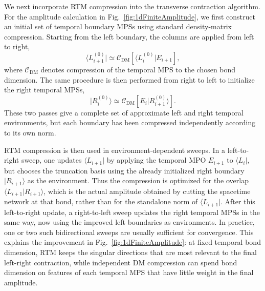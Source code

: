 \documentclass[12pt]{article}
\begin{document}
We next incorporate RTM compression into the transverse contraction algorithm.
For the amplitude calculation in Fig.~\ref{fig:1dFiniteAmplitude}, we first construct an initial set of temporal boundary MPSs using standard density-matrix compression.
Starting from the left boundary, the columns are applied from left to right,
\begin{equation}
\langle L_{i+1}^{(0)}|\simeq \mathcal C_{\mathrm{DM}}\!\left[\langle L_i^{(0)}|E_{i+1}\right],
\end{equation}
where \(\mathcal C_{\mathrm{DM}}\) denotes compression of the temporal MPS to the chosen bond dimension.
The same procedure is then performed from right to left to initialize the right temporal MPSs,
\begin{equation}
|R_i^{(0)}\rangle\simeq \mathcal C_{\mathrm{DM}}\!\left[E_i|R_{i+1}^{(0)}\rangle\right].
\end{equation}
These two passes give a complete set of approximate left and right temporal environments, but each boundary has been compressed independently according to its own norm.

RTM compression is then used in environment-dependent sweeps.
In a left-to-right sweep, one updates \(\langle L_{i+1}|\) by applying the temporal MPO \(E_{i+1}\) to \(\langle L_i|\), but chooses the truncation basis using the already initialized right boundary \(|R_{i+1}\rangle\) as the environment.
Thus the compression is optimized for the overlap \(\langle L_{i+1}|R_{i+1}\rangle\), which is the actual amplitude obtained by cutting the spacetime network at that bond, rather than for the standalone norm of \(\langle L_{i+1}|\).
After this left-to-right update, a right-to-left sweep updates the right temporal MPSs in the same way, now using the improved left boundaries as environments.
In practice, one or two such bidirectional sweeps are usually sufficient for convergence.
This explains the improvement in Fig.~\ref{fig:1dFiniteAmplitude}: at fixed temporal bond dimension, RTM keeps the singular directions that are most relevant to the final left-right contraction, while independent DM compression can spend bond dimension on features of each temporal MPS that have little weight in the final amplitude.
\end{document}
